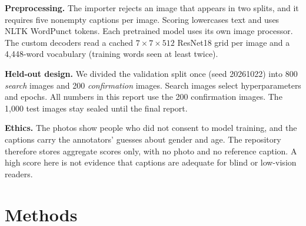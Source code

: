 \documentclass[11pt]{article}
\begin{document}
\textbf{Preprocessing.} The importer rejects an image that appears in two
splits, and it requires five nonempty captions per image. Scoring lowercases
text and uses NLTK WordPunct tokens. Each pretrained model uses its own image
processor. The custom decoders read a cached $7\times7\times512$ ResNet18 grid
per image and a 4,448-word vocabulary (training words seen at least twice).

\textbf{Held-out design.} We divided the validation split once (seed 20261022)
into 800 \emph{search} images and 200 \emph{confirmation} images. Search images
select hyperparameters and epochs. All numbers in this report use the 200
confirmation images. The 1,000 test images stay sealed until the final report.

\textbf{Ethics.} The photos show people who did not consent to model training,
and the captions carry the annotators' guesses about gender and age. The
repository therefore stores aggregate scores only, with no photo and no
reference caption. A high score here is not evidence that captions are
adequate for blind or low-vision readers.

\section{Methods}
\end{document}
